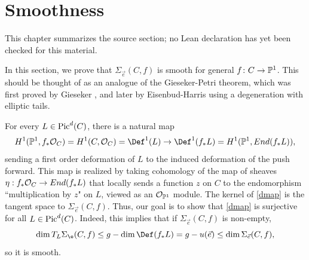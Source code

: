 \chapter{Smoothness}
\label{refined-brill-noether-theory-hurwitz-spaces-chapter-04}

\begin{remark}
\label{refined-brill-noether-theory-hurwitz-spaces-chapter-04-source}
This chapter summarizes the source section; no Lean declaration has yet been
checked for this material.
\notready
\end{remark}

\label{smoothness}

In this section, we prove that $\Sigma_{\vec{e}}(C, f)$ is smooth for general $f\colon  C \rightarrow \mathbb{P}^1$. This should be thought of as an analogue of the Gieseker-Petri theorem, which was first proved by Gieseker \cite{G}, and later by Eisenbud-Harris \cite{EH2} using a degeneration with elliptic tails.

For every $L \in \operatorname{Pic}^d(C)$, there is a natural map
\begin{equation} \label{dmap}\dcref{4.1}
\source{refined-brill-noether-theory-hurwitz-spaces}
H^1(\pp^1, f_*\O_C) =H^1(C, \O_C) = \Def^1(L) \rightarrow \Def^1(f_*L) = H^1(\pp^1, End(f_*L)),
\end{equation}
sending a first order deformation of $L$ to the induced deformation of the push forward. This map is realized by taking cohomology of the map of sheaves $\eta: f_*\mathcal{O}_C \rightarrow End(f_*L)$ that locally sends a function $z$ on $C$ to the endomorphism ``multiplication by $z$" on $L$, viewed as an $\mathcal{O}_{\mathbb{P}^1}$ module.
The kernel of \eqref{dmap} is the tangent space to $\Sigma_{\vec{e}}(C, f)$.
Thus, our goal is to show that \eqref{dmap} is surjective for all $L \in \operatorname{Pic}^d(C)$. Indeed, this implies that if $\Sigma_{\vec{e}}(C, f)$ is non-empty,
\[\dim T_L \Sigma_{\e}(C, f) \leq g - \dim \Def(f_*L) = g - u(\vec{e}) \leq \dim \Sigma_{\vec{e}}(C, f),\]
so it is smooth.

